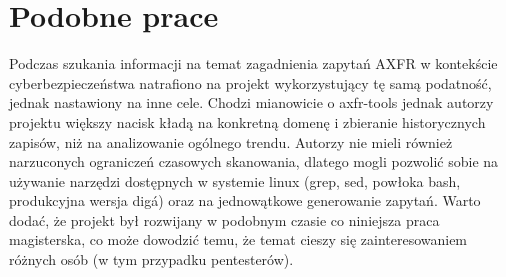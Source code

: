 \section{Podobne prace}

Podczas szukania informacji na temat zagadnienia zapytań AXFR w kontekście cyberbezpieczeństwa natrafiono na projekt wykorzystujący tę samą podatność, jednak nastawiony na inne cele. Chodzi mianowicie o axfr-tools\cite{axfrtools} jednak autorzy projektu większy nacisk kładą na konkretną domenę i zbieranie historycznych zapisów, niż na analizowanie ogólnego trendu. Autorzy nie mieli również narzuconych ograniczeń czasowych skanowania, dlatego mogli pozwolić sobie na używanie narzędzi dostępnych w systemie linux (grep, sed, powłoka bash, produkcyjna wersja dig\'a) oraz na jednowątkowe generowanie zapytań. Warto dodać, że projekt był rozwijany w podobnym czasie co niniejsza praca magisterska, co może dowodzić temu, że temat cieszy się zainteresowaniem różnych osób (w tym przypadku pentesterów).

